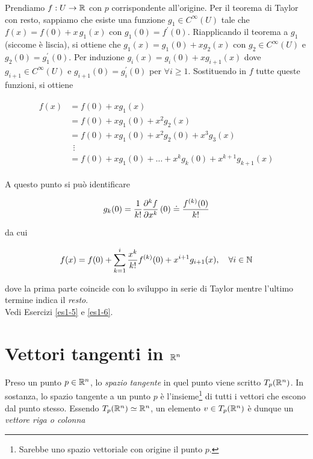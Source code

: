 Prendiamo $ f : U \to \mathbb{R} $ con $ p $ corrispondente all'origine. Per il teorema di Taylor con resto, sappiamo che esiste una funzione $ g_{1} \in C^{\infty}(U) $ tale che $ f(x) = f(0) + x \, g_{1}(x) $ con $ g_{1}(0) = f^{\prime}(0) $. Riapplicando il teorema a $ g_{1} $ (siccome è liscia), si ottiene che $ g_{1}(x) = g_{1}(0) + x g_{2}(x) $ con $ g_{2} \in C^{\infty}(U) $ e $ g_{2}(0) = g_{1}^{\prime}(0) $. Per induzione $ g_{i}(x) = g_{i}(0) + x g_{i+1}(x) $ dove $ g_{i+1} \in C^{\infty} (U) $ e $ g_{i+1}(0) = g_{i}^{\prime}(0) $ per $ \forall i \geqslant 1 $. Sostituendo in $ f $ tutte queste funzioni, si ottiene

\begin{align}
	\begin{split}
			f(x) &= f(0) + x g_{1}(x)\\
			&= f(0) + x g_{1}(0) + x^{2} g_{2}(x)\\
			&= f(0) + x g_{1}(0) + x^{2} g_{2}(0) + x^{3} g_{3}(x)\\
			& \;\, \vdots\\
			&= f(0) + x g_{1}(0) + \dots + x^{k} g_{k}(0) + x^{k+1} g_{k+1}(x)
	\end{split}
\end{align}

A questo punto si può identificare

\begin{equation}
	g_{k}(0) = \dfrac{1}{k!} \pdv[k]{f}{x} \, (0) \doteq \dfrac{f^{(k)}(0)}{k!}
\end{equation}

da cui

\begin{equation}
	f(x) = f(0) + \sum_{k=1}^{i} \dfrac{x^{k}}{k!} f^{(k)} (0) + x^{i+1} g_{i+1}(x) \qcomma \forall i \in \N
\end{equation}

dove la prima parte coincide con lo sviluppo in serie di Taylor mentre l'ultimo termine indica il \textit{resto}.\\
Vedi Esercizi \ref{es1-5} e \ref{es1-6}.

\section{Vettori tangenti in $ \mathbb{R}^{n} $}

Preso un punto $ p \in \mathbb{R}^{n} $, lo \textit{spazio tangente} in quel punto viene scritto $ T_{p}(\mathbb{R}^{n}) $. In sostanza, lo spazio tangente a un punto $ p $ è l'insieme\footnote{%
	Sarebbe uno spazio vettoriale con origine il punto $ p $.%
} di tutti i vettori che escono dal punto stesso. Essendo $ T_{p}(\mathbb{R}^{n}) \simeq \mathbb{R}^{n} $, un elemento $ v \in T_{p}(\mathbb{R}^{n}) $ è dunque un \textit{vettore riga o colonna}

